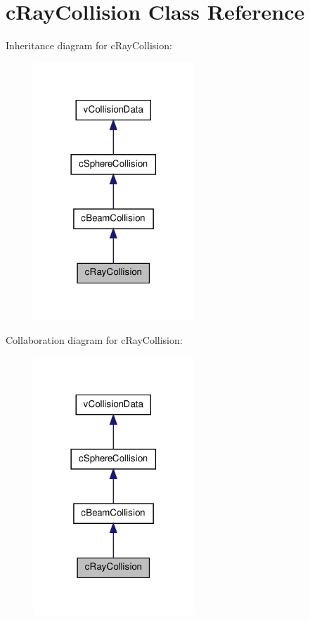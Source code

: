 \hypertarget{classc_ray_collision}{
\section{cRayCollision Class Reference}
\label{classc_ray_collision}
}


Inheritance diagram for cRayCollision:
\nopagebreak
\begin{figure}[H]
\begin{center}
\leavevmode
\includegraphics[width=170pt]{classc_ray_collision__inherit__graph}
\end{center}
\end{figure}


Collaboration diagram for cRayCollision:
\nopagebreak
\begin{figure}[H]
\begin{center}
\leavevmode
\includegraphics[width=170pt]{classc_ray_collision__coll__graph}
\end{center}
\end{figure}
